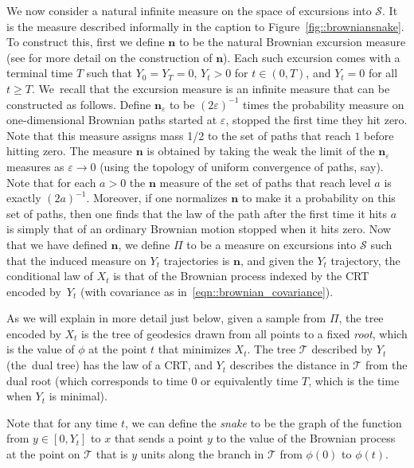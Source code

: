 \documentclass[JEP,XML,SOM,Unicode]{cedram}
\let\mathcal\mathscr
\let\oldS\S
\let\epsilon\varepsilon
\theoremstyle{plain}
\numberwithin{theorem}{section}
\theoremstyle{definition}
\newcommand{\CT}{{\mathcal T}}\let\treespace\CT
\newcommand{\snake}{{\mathcal S}}
\renewcommand{\S}{{\mathbf S}}
\newcommand{\excursion}{{\boldsymbol n}}
\let\snakeexcursionmeasure \Pi
\begin{document}
We now consider a natural infinite measure on the space of excursions into $\snake$. It is the measure described informally in the caption to Figure~\ref{fig::browniansnake}. To construct this, first we define $\excursion$ to be the natural Brownian excursion measure (see \cite[Chap.\,XII, \oldS 4]{ry99martingales} for more detail on the construction of $\excursion$).
Each such excursion comes with a terminal time $T$ such that $Y_0 = Y_T = 0$, $Y_t > 0$ for $t \in (0,T)$, and $Y_t = 0$ for all $t \geq T$. We~recall that the excursion measure is an infinite measure that can be constructed as follows. Define $\excursion_\epsilon$ to be $(2\epsilon)^{-1}$ times the probability measure on one-dimensional Brownian paths started at $\epsilon$, stopped the first time they hit zero. Note that this measure assigns mass 1/2 to the set of paths that reach $1$ before hitting zero. The measure $\excursion$ is obtained by taking the weak the limit of the $\excursion_\epsilon$ measures as $\epsilon \to 0$ (using the topology of uniform convergence of paths, say). Note that for each $a>0$ the $\excursion$ measure of the set of paths that reach level $a$ is exactly $(2a)^{-1}$. Moreover, if one normalizes $\excursion$ to make it a probability on this set of paths, then one finds that the law of the path after the first time it hits $a$ is simply that of an ordinary Brownian motion stopped when it hits zero. Now that we have defined $\excursion$, we define $\snakeexcursionmeasure$ to be a measure on excursions into $\snake$ such that the induced measure on $Y_t$ trajectories is $\excursion$, and given the $Y_t$ trajectory, the conditional law of $X_t$ is that of the Brownian process indexed by the CRT encoded by~$Y_t$ (\ie with covariance as in~\eqref{eqn::brownian_covariance}).

As we will explain in more detail just below, given a sample from $\snakeexcursionmeasure$, the tree encoded by $X_t$ is the tree of geodesics drawn from all points to a fixed \emph{root}, which is the value of $\phi$ at the point $t$ that minimizes $X_t$. The tree $\CT$ described by $Y_t$ (the~dual tree) has the law of a CRT, and $Y_t$ describes the distance in $\CT$ from the dual root (which corresponds to time $0$ or equivalently time $T$, which is the time when $Y_t$ is minimal).

Note that for any time $t$, we can define the \emph{snake} to be the graph of the function from $y\in [0,Y_t]$ to $x$ that sends a point $y$ to the value of the Brownian process at the point on $\CT$ that is $y$ units along the branch in $\mathcal T$ from $\phi(0)$ to $\phi(t)$.
\end{document}
